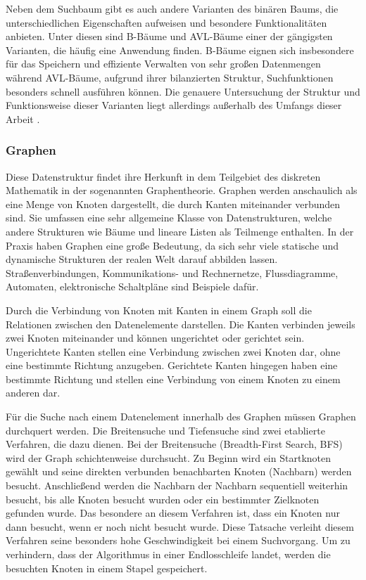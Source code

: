 Neben dem Suchbaum gibt es auch andere Varianten des binären Baums, die unterschiedlichen Eigenschaften aufweisen und besondere Funktionalitäten anbieten. Unter diesen sind B-Bäume und AVL-Bäume einer der gängigsten Varianten, die häufig eine Anwendung finden. B-Bäume eignen sich insbesondere für das Speichern und effiziente Verwalten von sehr großen Datenmengen während AVL-Bäume, aufgrund ihrer bilanzierten Struktur, Suchfunktionen besonders schnell ausführen können. Die genauere Untersuchung der Struktur und Funktionsweise dieser Varianten liegt allerdings außerhalb des Umfangs dieser Arbeit \autocite[407-412]{gumm_band_2016}.

\subsubsection{Graphen}
Diese Datenstruktur findet ihre Herkunft in dem Teilgebiet des diskreten Mathematik in der sogenannten Graphentheorie. Graphen werden anschaulich als eine Menge von Knoten dargestellt, die durch Kanten miteinander verbunden sind. Sie umfassen eine sehr allgemeine Klasse von Datenstrukturen, welche andere Strukturen wie Bäume und lineare Listen als Teilmenge enthalten. In der Praxis haben Graphen eine große Bedeutung, da sich sehr viele statische und dynamische Strukturen der realen Welt darauf abbilden lassen. Straßenverbindungen, Kommunikations- und Rechnernetze, Flussdiagramme, Automaten, elektronische Schaltpläne sind Beispiele dafür. \autocite[215]{knebl_algorithmen_2021} \autocite[654]{ernst_grundkurs_2020}

Durch die Verbindung von Knoten mit Kanten in einem Graph soll die Relationen zwischen den Datenelemente darstellen. Die Kanten verbinden jeweils zwei Knoten miteinander und können ungerichtet oder gerichtet sein. Ungerichtete Kanten stellen eine Verbindung zwischen zwei Knoten dar, ohne eine bestimmte Richtung anzugeben. Gerichtete Kanten hingegen haben eine bestimmte Richtung und stellen eine Verbindung von einem Knoten zu einem anderen dar. \autocite[221-222]{knebl_algorithmen_2021}

Für die Suche nach einem Datenelement innerhalb des Graphen müssen Graphen durchquert werden. Die Breitensuche und Tiefensuche sind zwei etablierte Verfahren, die dazu dienen. Bei der Breitensuche (Breadth-First Search, BFS) wird der Graph schichtenweise durchsucht. Zu Beginn wird ein Startknoten gewählt und seine direkten verbunden benachbarten Knoten (Nachbarn) werden besucht. Anschließend werden die Nachbarn der Nachbarn sequentiell weiterhin besucht, bis alle Knoten besucht wurden oder ein bestimmter Zielknoten gefunden wurde. Das besondere an diesem Verfahren ist, dass ein Knoten nur dann besucht, wenn er noch nicht besucht wurde. Diese Tatsache verleiht diesem Verfahren seine besonders hohe Geschwindigkeit bei einem Suchvorgang. Um zu verhindern, dass der Algorithmus in einer Endlosschleife landet, werden die besuchten Knoten in einem Stapel gespeichert. \autocite[227-228]{knebl_algorithmen_2021} \autocite[666]{ernst_grundkurs_2020}

